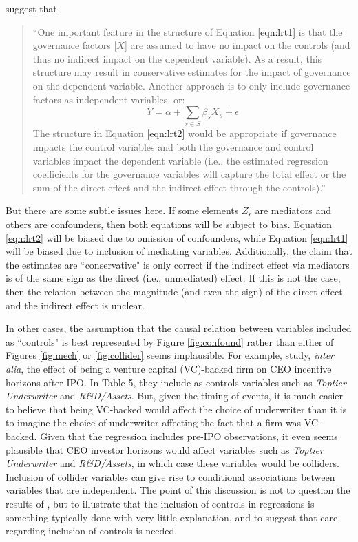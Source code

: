 \documentclass[11pt,reqno,titlepage]{amsart}
\begin{document}
\begin{doublespace}
\citet{Larcker:2007aa} suggest that 
\begin{quote}
``One important feature in the structure of Equation \ref{eqn:lrt1} is that the governance factors [$X$] are assumed to have no impact on the controls (and thus no indirect impact on the dependent variable). 
As a result, this structure may result in conservative estimates for the impact of governance on the dependent variable. Another approach is to only include governance factors as independent variables, or:
\begin{equation}
Y = \alpha + \sum_{s \in S} \beta_s X_s + \epsilon \label{eqn:lrt2}
\end{equation}
The structure in Equation \ref{eqn:lrt2} would be appropriate if governance impacts the control variables and both the governance and control variables impact the dependent variable (i.e., the estimated regression coefficients for the governance variables will capture the total effect or the sum of the direct effect and the indirect effect through the controls).''
\end{quote}

But there are some subtle issues here.
If some elements $Z_r$ are mediators and others are confounders, then both equations will be subject to bias. 
Equation \ref{eqn:lrt2} will be biased due to omission of confounders, while Equation \ref{eqn:lrt1}  will be biased due to inclusion of mediating variables.
Additionally, the claim that the estimates are ``conservative" is only correct if the indirect effect via mediators is of the same sign as the direct (i.e., unmediated) effect. 
If this is not the case, then the relation between the magnitude (and even the sign) of the direct effect and the indirect effect is unclear.

In other cases, the assumption that the causal relation between variables included as ``controls" is best represented by Figure \ref{fig:confound} rather than either of Figures \ref{fig:mech} or \ref{fig:collider} seems implausible.
For example, \citet{Cadman:2014cr} study, \emph{inter alia}, the effect of being a venture capital (VC)-backed firm on CEO incentive horizons after IPO.
In Table 5, they include as controls variables such as \emph{Toptier Underwriter} and \emph{R\&D/Assets}.
But, given the timing of events, it is much easier to believe that being VC-backed would affect the choice of underwriter than it is to imagine the choice of underwriter affecting the fact that a firm was VC-backed.
Given that the regression includes pre-IPO observations, it even seems plausible that CEO investor horizons would affect variables such as \emph{Toptier Underwriter} and \emph{R\&D/Assets}, in which case these variables would be colliders.
Inclusion of collider variables can give rise to conditional associations between variables that are independent.
The point of this discussion is not to question the results of  \citet{Cadman:2014cr}, but to illustrate that the inclusion of controls in regressions is something typically done with very little explanation, and to suggest that care regarding inclusion of controls is needed.


\end{doublespace}
\end{document}
